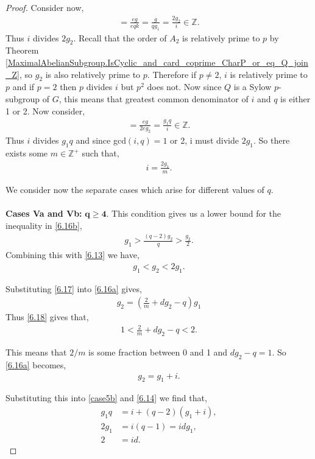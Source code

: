 \begin{proof}
Consider now,
\begin{align*} [G : N_G(Q)] = \frac{eg}{e q k} = \frac{g}{q g_1} = \frac{2 g_2}{i} \in \mathbb{Z}. %
\end{align*}
Thus $i$ divides $2 g_2$. Recall that the order of $A_2$ is relatively prime to $p$ by Theorem \ref{MaximalAbelianSubgroup.IsCyclic_and_card_coprime_CharP_or_eq_Q_join_Z}, so $g_2$ is also relatively prime to $p$. Therefore if $p \neq 2$, $i$ is relatively prime to $p$ and if $p=2$ then $p$ divides $i$ but $p^2$ does not. Now since $Q$ is a Sylow $p$-subgroup of $G$, this means that greatest common denominator of $i$ and $q$ is either 1 or 2.
Now consider,
\begin{align*} [G : N_G(A_2)] = \frac{eg}{2 e g_2} = \frac{g_1 q}{i} \in \mathbb{Z}. %
\end{align*}
Thus $i$ divides $g_1 q$ and since gcd$(i, q) = 1$ or 2, i must divide $2 g_1$. So there exists some $m \in \mathbb{Z^+}$ such that,
\begin{align}\label{6.17} i = \frac{2 g_1}{m}.
\end{align}

We consider now the separate cases which arise for different values of $q$. \\
\\
 \space \textbf{Cases Va and Vb:} $\pmb{q \geq 4}$. This condition gives us a lower bound for the inequality in \eqref{6.16b},
\begin{align*} g_1 > \frac{(q-2) g_2}{q} > \frac{g_2}{2}.
\end{align*}
Combining this with \eqref{6.13} we have,
\begin{align}\label{6.18} g_1 < g_2 < 2 g_1.
\end{align}

Substituting \eqref{6.17} into \eqref{6.16a} gives,
\begin{align*} g_2 = \left( \frac{2}{m} + d g_2 - q \right) g_1
\end{align*}
Thus \eqref{6.18} gives that,
\begin{align*} 1 < \frac{2}{m} + d g_2 - q < 2.
\end{align*}

This means that $2/m$ is some fraction between 0 and 1 and $d g_2 - q = 1$. So \eqref{6.16a} becomes,
\begin{align}\label{6.19} g_2 = g_1 + i.
\end{align}

Substituting this into \eqref{case5b} and \eqref{6.14} we find that,
\begin{align*} g_1 q &= i + (q - 2)(g_1 + i),
\\ 2 g_1 &= i(q - 1) = i d g_1, %
\\ 2 &= i d.
\end{align*}


\end{proof}
